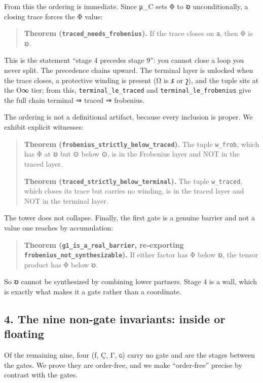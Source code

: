 From this the ordering is immediate. Since μ\_C sets Φ to 𐑹
unconditionally, a closing trace forces the Φ value:

\begin{quote}
\textbf{Theorem (\texttt{traced\_needs\_frobenius}).} If the trace
closes on \texttt{a}, then Φ is 𐑹.
\end{quote}

This is the statement ``stage 4 precedes stage 9'': you cannot close a
loop you never split. The precedence chains upward. The terminal layer
is unlocked when the trace closes, a protective winding is present (Ω is
𐑭 or 𐑟), and the tuple sits at the O∞ tier; from this,
\texttt{terminal\_le\_traced} and \texttt{terminal\_le\_frobenius} give
the full chain terminal ⇒ traced ⇒ frobenius.

The ordering is not a definitional artifact, because every inclusion is
proper. We exhibit explicit witnesses:

\begin{quote}
\textbf{Theorem (\texttt{frobenius\_strictly\_below\_traced}).} The
tuple \texttt{w\_frob}, which has Φ at 𐑹 but ⊙ below ⊙, is in the
Frobenius layer and NOT in the traced layer.

\textbf{Theorem (\texttt{traced\_strictly\_below\_terminal}).} The tuple
\texttt{w\_traced}, which closes its trace but carries no winding, is in
the traced layer and NOT in the terminal layer.
\end{quote}

The tower does not collapse. Finally, the first gate is a genuine
barrier and not a value one reaches by accumulation:

\begin{quote}
\textbf{Theorem (\texttt{g1\_is\_a\_real\_barrier}, re-exporting
\texttt{frobenius\_not\_synthesizable}).} If either factor has Φ below
𐑹, the tensor product has Φ below 𐑹.
\end{quote}

So 𐑹 cannot be synthesized by combining lower partners. Stage 4 is a
wall, which is exactly what makes it a gate rather than a coordinate.

\hypertarget{the-nine-non-gate-invariants-inside-or-floating}{%
\subsection{4. The nine non-gate invariants: inside or
floating}\label{the-nine-non-gate-invariants-inside-or-floating}}

Of the remaining nine, four (ƒ, Ç, Γ, ɢ) carry no gate and are the
stages between the gates. We prove they are order-free, and we make
``order-free'' precise by contrast with the gates.

